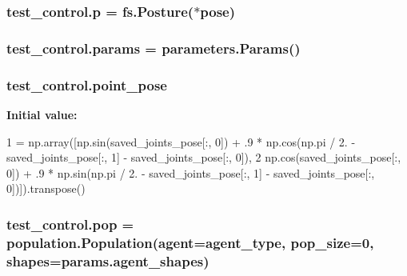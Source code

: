 \subsubsection[{\texorpdfstring{p}{p}}]{\setlength{\rightskip}{0pt plus 5cm}test\+\_\+control.\+p = fs.\+Posture($\ast${\bf pose})}\hypertarget{namespacetest__control_ad1be37697cee4f1a376671df94d424bb}{}\label{namespacetest__control_ad1be37697cee4f1a376671df94d424bb}
\subsubsection[{\texorpdfstring{params}{params}}]{\setlength{\rightskip}{0pt plus 5cm}test\+\_\+control.\+params = {\bf parameters.\+Params}()}\hypertarget{namespacetest__control_aec18b6291ee0bb2177b997d322d8ffe3}{}\label{namespacetest__control_aec18b6291ee0bb2177b997d322d8ffe3}
\subsubsection[{\texorpdfstring{point\+\_\+pose}{point_pose}}]{\setlength{\rightskip}{0pt plus 5cm}test\+\_\+control.\+point\+\_\+pose}\hypertarget{namespacetest__control_a2f3c84b9e8a2baaf30017976ca5c2edf}{}\label{namespacetest__control_a2f3c84b9e8a2baaf30017976ca5c2edf}
{\bfseries Initial value\+:}
\begin{DoxyCode}
1 = np.array([np.sin(saved\_joints\_pose[:, 0]) + .9 * np.cos(np.pi / 2. - saved\_joints\_pose[:, 1] - 
      saved\_joints\_pose[:, 0]),
2                            np.cos(saved\_joints\_pose[:, 0]) + .9 * np.sin(np.pi / 2. - saved\_joints\_pose[:, 
      1] - saved\_joints\_pose[:, 0])]).transpose()
\end{DoxyCode}
\subsubsection[{\texorpdfstring{pop}{pop}}]{\setlength{\rightskip}{0pt plus 5cm}test\+\_\+control.\+pop = population.\+Population(agent={\bf agent\+\_\+type}, pop\+\_\+size=0, shapes=params.\+agent\+\_\+shapes)}\hypertarget{namespacetest__control_a796fd07016d10db6914d0a5ccccb0732}{}\label{namespacetest__control_a796fd07016d10db6914d0a5ccccb0732}
